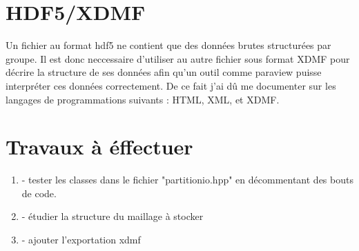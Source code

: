 \documentclass[12pt]{article}
\begin{document}
\section {HDF5/XDMF}
Un fichier au format hdf5 ne contient que des données brutes structurées par groupe. Il est donc neccessaire d'utiliser au autre fichier sous format XDMF pour décrire la structure de ses données afin qu'un outil comme paraview puisse interpréter ces données correctement. De ce fait j'ai dû me documenter sur les langages de programmations suivants : HTML, XML, et XDMF.
\section {Travaux à éffectuer}
\begin {enumerate}
    \item - tester les classes dans le fichier "partitionio.hpp" en décommentant des bouts de code.
    \item - étudier la structure du maillage à stocker
    \item - ajouter l'exportation xdmf
\end {enumerate}
\end{document}
